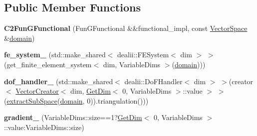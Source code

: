 \subsection*{\-Public \-Member \-Functions}
\begin{DoxyCompactItemize}
\item 
\hypertarget{classSpacy_1_1dealII_1_1C2FunGFunctional_3_01FunGFunctional_00_01dim_00_01VariableDim_3_01variable__dims_8_8_8_4_01_4_a4ef60d584e074d99d6959d3587649a58}{{\bfseries \-C2\-Fun\-G\-Functional} (\-Fun\-G\-Functional \&\&functional\-\_\-impl, const \hyperlink{classSpacy_1_1VectorSpace}{\-Vector\-Space} \&\hyperlink{classSpacy_1_1FunctionalBase_a2d3397deb9fa1ad85ed04e37a03b3aa6}{domain})}\label{classSpacy_1_1dealII_1_1C2FunGFunctional_3_01FunGFunctional_00_01dim_00_01VariableDim_3_01variable__dims_8_8_8_4_01_4_a4ef60d584e074d99d6959d3587649a58}

\item 
\hypertarget{classSpacy_1_1dealII_1_1C2FunGFunctional_3_01FunGFunctional_00_01dim_00_01VariableDim_3_01variable__dims_8_8_8_4_01_4_a5648bf746ea5cdf3c2ff676e385dbf48}{{\bfseries fe\-\_\-system\-\_\-} (std\-::make\-\_\-shared$<$ dealii\-::\-F\-E\-System$<$ dim $>$ $>$(get\-\_\-finite\-\_\-element\-\_\-system$<$ dim, \-Variable\-Dims $>$(\hyperlink{classSpacy_1_1FunctionalBase_a2d3397deb9fa1ad85ed04e37a03b3aa6}{domain})))}\label{classSpacy_1_1dealII_1_1C2FunGFunctional_3_01FunGFunctional_00_01dim_00_01VariableDim_3_01variable__dims_8_8_8_4_01_4_a5648bf746ea5cdf3c2ff676e385dbf48}

\item 
\hypertarget{classSpacy_1_1dealII_1_1C2FunGFunctional_3_01FunGFunctional_00_01dim_00_01VariableDim_3_01variable__dims_8_8_8_4_01_4_a766b9a7820e812a7bdcc5641d27d5413}{{\bfseries dof\-\_\-handler\-\_\-} (std\-::make\-\_\-shared$<$ dealii\-::\-Do\-F\-Handler$<$ dim $>$ $>$(creator$<$ \hyperlink{classSpacy_1_1dealII_1_1VectorCreator}{\-Vector\-Creator}$<$ dim, \hyperlink{structSpacy_1_1dealII_1_1GetDim}{\-Get\-Dim}$<$ 0, \-Variable\-Dims $>$\-::value $>$ $>$(\hyperlink{group__ProductSpaceGroup_ga6054e5c78652ac4959f5d521acadd86a}{extract\-Sub\-Space}(\hyperlink{classSpacy_1_1FunctionalBase_a2d3397deb9fa1ad85ed04e37a03b3aa6}{domain}, 0)).triangulation()))}\label{classSpacy_1_1dealII_1_1C2FunGFunctional_3_01FunGFunctional_00_01dim_00_01VariableDim_3_01variable__dims_8_8_8_4_01_4_a766b9a7820e812a7bdcc5641d27d5413}

\item 
\hypertarget{classSpacy_1_1dealII_1_1C2FunGFunctional_3_01FunGFunctional_00_01dim_00_01VariableDim_3_01variable__dims_8_8_8_4_01_4_a50e6c19bfda84bdaf4f2a89c4d9eb6f0}{{\bfseries gradient\-\_\-} (\-Variable\-Dims\-::size==1?\hyperlink{structSpacy_1_1dealII_1_1GetDim}{\-Get\-Dim}$<$ 0, \-Variable\-Dims $>$\-::value\-:\-Variable\-Dims\-::size)}\label{classSpacy_1_1dealII_1_1C2FunGFunctional_3_01FunGFunctional_00_01dim_00_01VariableDim_3_01variable__dims_8_8_8_4_01_4_a50e6c19bfda84bdaf4f2a89c4d9eb6f0}


\end{DoxyCompactItemize}
